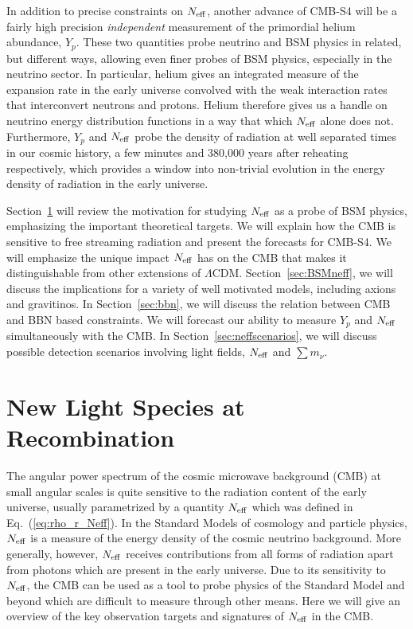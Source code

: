 In addition to precise constraints on $N_{\rm eff}$, another advance of CMB-S4 will be a fairly high precision {\it independent} measurement of the primordial helium abundance, $Y_p$. These two quantities probe neutrino and BSM physics in related, but different ways, allowing even finer probes of BSM physics, especially in the neutrino sector.  In particular, helium gives an integrated measure of the expansion rate in the early universe convolved with the weak interaction rates that interconvert neutrons and protons. Helium therefore gives us a handle on neutrino energy distribution functions in a way that which $N_{\rm eff}$ alone does not.  Furthermore, $Y_p$ and $N_{\rm eff}$ probe the density of radiation at well separated times in our cosmic history, a few minutes and 380,000 years after reheating respectively, which provides a window into non-trivial evolution in the energy density of radiation in the early universe.  

Section~\ref{sec:Neff} will review the motivation for studying $N_{\rm eff}$ as a probe of BSM physics, emphasizing the important theoretical targets.  We will explain how the CMB is sensitive to free streaming radiation and present the forecasts for CMB-S4.  We will emphasize the unique impact $N_{\rm eff}$ has on the CMB that makes it distinguishable from other extensions of $\Lambda$CDM.   Section~\ref{sec:BSMneff}, we will discuss the implications for a variety of well motivated models, including axions and gravitinos.  In Section~\ref{sec:bbn}, we will discuss the relation between CMB and BBN based constraints.  We will forecast our ability to measure $Y_p$ and $N_{\rm eff}$ simultaneously with the CMB.  In Section~\ref{sec:neffscenarios}, we will discuss possible detection scenarios involving light fields, $N_{\rm eff}$ and $\sum m_\nu$.


\section{New Light Species at Recombination}\label{sec:Neff}


The angular power spectrum of the cosmic microwave background (CMB) at small angular scales is quite sensitive to the radiation content of the early universe, usually parametrized by a quantity $N_{\rm eff}$ which was defined in Eq.~(\ref{eq:rho_r_Neff}).  In the Standard Models of cosmology and particle physics, $N_{\rm eff}$ is a measure of the energy density of the cosmic neutrino background.  More generally, however, $N_{\rm eff}$ receives contributions from all forms of radiation apart from photons which are present in the early universe.  Due to its sensitivity to $N_{\rm eff}$, the CMB can be used as a tool to probe physics of the Standard Model and beyond which are difficult to measure through other means.  Here we will give an overview of the key observation targets and signatures of $N_{\rm eff}$ in the CMB.  






